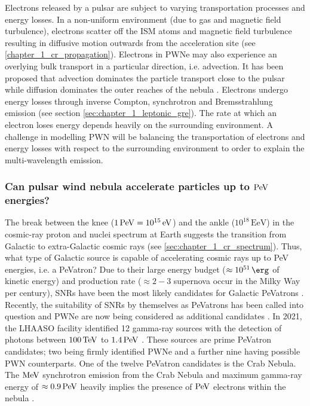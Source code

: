 Electrons released by a pulsar are subject to varying transportation processes and energy losses. In a non-uniform environment (due to gas and magnetic field turbulence), electrons scatter off the ISM atoms and magnetic field turbulence resulting in diffusive motion outwards from the acceleration site (see \autoref{chapter_1_cr_propagation}). Electrons in PWNe may also experience an overlying bulk transport in a particular direction, i.e. advection. It has been proposed that advection dominates the particle transport close to the pulsar while diffusion dominates the outer reaches of the nebula \citep{2020A&A...636A.113G, 2021PhRvD.104l3017R}. Electrons undergo energy losses through inverse Compton, synchrotron and Bremsstrahlung emission (see section \autoref{sec:chapter_1_leptonic_gre}). The rate at which an electron loses energy depends heavily on the surrounding environment.
\newpar
A challenge in modelling PWN will be balancing the transportation of electrons and energy losses with respect to the surrounding environment to order to explain the multi-wavelength emission.

\subsubsection{Can pulsar wind nebula accelerate particles up to $\PeV$ energies?}

The break between the knee ($1\,\PeV=10^{15}\,\eV$) and the ankle ($10^{18}\,\si{\exa\electronvolt}$) in the cosmic-ray proton and nuclei spectrum at Earth suggests the transition from Galactic to extra-Galactic cosmic rays (see \autoref{sec:chapter_1_cr_spectrum}). Thus, what type of Galactic source is capable of accelerating cosmic rays up to PeV energies, i.e. a PeVatron?
\newpar
Due to their large energy budget ($\approx 10^{51}\,\ergs$ of kinetic energy) and production rate ($\approx 2-3$ supernova occur in the Milky Way per century), SNRs have been the most likely candidates for Galactic PeVatrons \citep{1983A&A...125..249L, 1984ARA&A..22..425H,2004MNRAS.353..550B,10.1093/mnras/sty1589}. Recently, the suitability of SNRs by themselves as PeVatrons has been called into question \citep{CRISTOFARI2020102492} and PWNe are now being considered as additional candidates \citep{2018MNRAS.478..926O, Xin_2019, de_O_a_Wilhelmi_2022,2022A&A...660A...8B}.
\newpar
In 2021, the LHAASO facility identified 12 gamma-ray sources with the detection of photons between $100\,\TeV$ to $1.4\,\PeV$ \citep{2021Natur.594...33C}. These sources are prime PeVatron candidates; two being firmly identified PWNe and a further nine having possible PWN counterparts. One of the twelve PeVatron candidates is the Crab Nebula. The $\si{\mega\electronvolt}$ synchrotron emission from the Crab Nebula and maximum gamma-ray energy of $\approx 0.9\,\PeV$ heavily implies the presence of $\PeV$ electrons within the nebula \citep{doi:10.1126/science.abg5137}.

